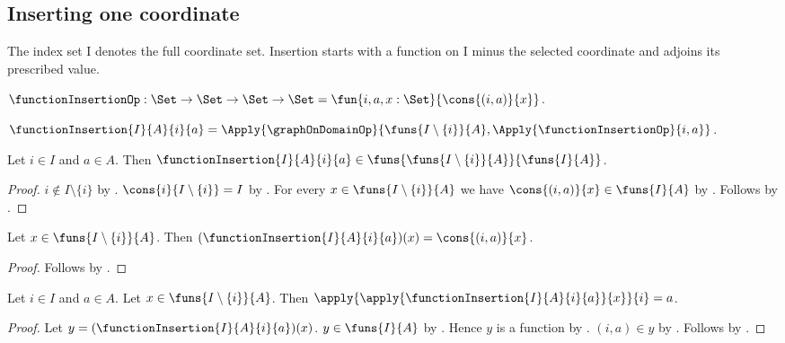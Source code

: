 \subsection{Inserting one coordinate}

The index set I denotes the full coordinate set. Insertion starts with a
function on I minus the selected coordinate and adjoins its prescribed value.

\begin{definition}\label{function_insertion_op}
    $\functionInsertionOp:\Set\to\Set\to\Set\to\Set
        =\fun{i,a,x:\Set}{\cons{(i,a)}{x}}$.
\end{definition}

\begin{definition}\label{function_insertion}
    $\functionInsertion{I}{A}{i}{a}
        =\Apply{\graphOnDomainOp}{\funs{I\setminus\{i\}}{A},
            \Apply{\functionInsertionOp}{i,a}}$.
\end{definition}

\begin{proposition}\label{function_insertion_type}
    Let $i\in I$ and $a\in A$.
    Then $\functionInsertion{I}{A}{i}{a}\in
        \funs{\funs{I\setminus\{i\}}{A}}{\funs{I}{A}}$.
\end{proposition}
\begin{proof}
    $i\notin I\setminus\{i\}$ by .
    $\cons{i}{I\setminus\{i\}}=I$ by .
    For every $x\in\funs{I\setminus\{i\}}{A}$ we have
        $\cons{(i,a)}{x}\in\funs{I}{A}$ by .
    Follows by .
\end{proof}

\begin{proposition}\label{function_insertion_apply}
    Let $x\in\funs{I\setminus\{i\}}{A}$.
    Then $(\functionInsertion{I}{A}{i}{a})(x)=\cons{(i,a)}{x}$.
\end{proposition}
\begin{proof}
    Follows by .
\end{proof}

\begin{proposition}\label{function_insertion_selected_coordinate}
    Let $i\in I$ and $a\in A$.
    Let $x\in\funs{I\setminus\{i\}}{A}$.
    Then $\apply{\apply{\functionInsertion{I}{A}{i}{a}}{x}}{i}=a$.
\end{proposition}
\begin{proof}
    Let $y=(\functionInsertion{I}{A}{i}{a})(x)$.
    $y\in\funs{I}{A}$ by .
    Hence $y$ is a function by .
    $(i,a)\in y$ by .
    Follows by .
\end{proof}

